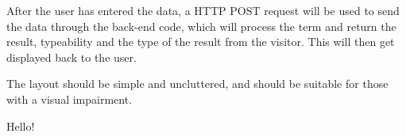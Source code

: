 \documentclass[a4paper,12pt]{report}
\begin{document}
After the user has entered the data, a HTTP POST request will be used to send the data through the back-end code, which will process the term and return the result, typeability and the type of the result from the visitor. This will then get displayed back to the user.

The layout should be simple and uncluttered, and should be suitable for those with a visual impairment.



\newpage
Hello! \cite{CourseSpecification}
\cite{Tarau2017}
\cite{Acar2008}
\cite{Barendregt2000}
\cite{Bird2009}
\cite{Alonzo1936}
\cite{Gay2019}
\cite{Everett2019}
\cite{Hankin2004}
\cite{Horowitz2013}
\cite{Kamareddine2000}
\cite{Loader1998}
\cite{Parr2012}
\cite{Pierce2002}
\cite{Rojas1998}
\cite{Scott2016}
\cite{Selinger2013}
\cite{Slonneger1995}
\cite{Sookocheff2018Eta}
\cite{Sookocheff2018Evaluation}
\cite{Tomassetti2007}
\cite{Srivastav2017}

\printbibliography
\end{document}
